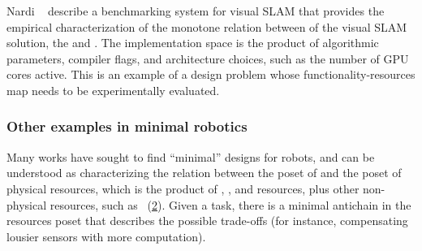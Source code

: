 \begin{example}
    Nardi\,\,\etal~\cite{zia16comparative} describe a benchmarking
    system for visual SLAM that provides the empirical characterization
    of the monotone relation between  of the visual
    SLAM solution, the  and .
    The implementation space is the product
    of algorithmic parameters, compiler flags, and architecture choices,
    such as the number of GPU cores active.
    This is an example of a design
    problem whose functionality-resources map needs to be experimentally
    evaluated.
\end{example}

\begin{figure}[h]
    \centering
    \caption{}
    \label{fig:dp_zia}
\end{figure}

\subsubsection{Other examples in minimal robotics}

Many works have sought to find ``minimal'' designs for robots, and
can be understood as characterizing the relation between the poset
of  and the poset of physical resources, which is the product
of , , and  resources,
plus other non-physical resources, such as ~(\cref{fig:robot-generic}).
Given a task, there is a minimal antichain in the resources poset
that describes the possible trade-offs (for instance, compensating lousier
sensors with more computation).



\begin{figure}
    \centering
    \caption{}
    \label{fig:robot-generic}
\end{figure}



